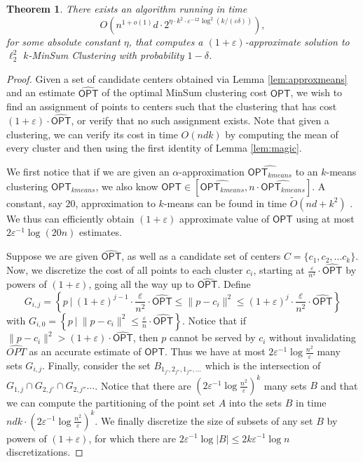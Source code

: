 \documentclass[10pt,a4paper]{amsart}
\newtheorem{theorem}{Theorem}[section]
\def \OPT    {\mdef{\mathsf{OPT}}}
\newcommand{\mdef}[1]{{\ensuremath{#1}}\xspace}  %
\begin{document}
\begin{theorem}
    There exists an algorithm running in time
    $$O\left(n^{1+o(1)}d\cdot  2^{\eta\cdot k^2 \cdot \varepsilon^{-12} \log^2(k/(\varepsilon\delta))}\right),$$ 
    for some absolute constant $\eta$, that computes a $(1+\varepsilon)$-approximate solution to $\ell_2^2$ $k$-MinSum Clustering with probability $1-\delta$.
\end{theorem}
\begin{proof}
Given a set of candidate centers obtained via Lemma \ref{lem:approxmeans} and an estimate $\widehat{\OPT}$ of the optimal MinSum clustering cost $\OPT$, we wish to find an assignment of points to centers such that the clustering that has cost $(1+\varepsilon)\cdot\widehat{\OPT}$, or verify that no such assignment exists.
Note that given a clustering, we can verify its cost in time $O(ndk)$ by computing the mean of every cluster and then using the first identity of Lemma \ref{lem:magic}.

We first notice that if we are given an $\alpha$-approximation $\widehat{\OPT_{kmeans}}$ to an $k$-means clustering $\OPT_{kmeans}$, we also know $\OPT\in \left[\widehat{\OPT_{kmeans}},n\cdot \widehat{\OPT_{kmeans}}\right]$. A constant, say $20$, approximation to $k$-means can be found in time $\tilde{O}(nd + k^2)$ \cite{DraganovSS24}. We thus can efficiently obtain  $(1+\varepsilon)$ approximate value of $\OPT$ using at most $2\varepsilon^{-1}\log(20n)$ estimates.

Suppose we are given $\widehat{\OPT}$, as well as a candidate set of centers $C=\{c_1,c_2,\ldots c_k\}$.
Now, we discretize the cost of all points to each cluster $c_i$, starting at $\frac{\varepsilon}{n^2}\cdot \widehat{\OPT}$ by powers of $(1+\varepsilon)$, going all the way up to $\widehat{\OPT}$. Define 
$$G_{i,j}=\left\{p~|~ (1+\varepsilon)^{j-1} \cdot \frac{\varepsilon}{n^2}\cdot \widehat{\OPT}\leq \|p-c_i\|^2 \leq (1+\varepsilon)^{j} \cdot \frac{\varepsilon}{n^2}\cdot\widehat{\OPT}\right\}$$ 
with $G_{i,0} = \left\{p~|~ \|p-c_i\|^2 \leq \frac{\varepsilon}{ n}\cdot\widehat{\OPT}\right\}$. Notice that if $\|p-c_i\|^2>(1+\varepsilon)\cdot \widehat{\OPT}$, then $p$ cannot be served by $c_i$ without invalidating $\widehat{OPT}$ as an accurate estimate of $\OPT$. Thus we have at most $2\varepsilon^{-1}\log \frac{n^2}{\varepsilon}$ many sets $G_{i,j}$. Finally, consider the set 
$B_{1_{j'},2_{j''},1_{j'''},\ldots }$ which is the intersection of $G_{1,j}\cap G_{2,j'}\cap G_{2,j''}\ldots$.
Notice that there are $\left(2\varepsilon^{-1}\log \frac{n^2}{\varepsilon}\right)^k$ many sets $B$ and that we can compute the partitioning of the point set $A$ into the sets $B$ in time $ndk\cdot \left(2\varepsilon^{-1}\log \frac{n^2}{\varepsilon}\right)^k$.
We finally discretize the size of subsets of any set $B$ by powers of $(1+\varepsilon)$, for which there are $2\varepsilon^{-1}\log |B| \leq 2k\varepsilon^{-1}\log n$ discretizations. 


\end{proof}
\end{document}
